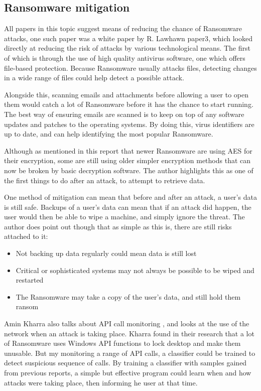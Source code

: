 \documentclass[journal,comsoc]{IEEEtran}
\begin{document}
\subsection{Ransomware mitigation}
All papers in this topic suggest means of reducing the chance of Ransomware attacks, one such paper was a white paper by R. Lawhawn {paper3}, which looked directly at reducing the risk of attacks by various technological means.  The first of which is through the use of high quality antivirus software, one which offers file-based protection. Because Ransomware usually attacks files, detecting changes in a wide range of files could help detect a possible attack. \par
Alongside this, scanning emails and attachments before allowing a user to open them would catch a lot of Ransomware before it has the chance to start running. The best way of ensuring emails are scanned is to keep on top of any software updates and patches to the operating systems. By doing this, virus identifiers are up to date, and can help identifying the most popular Ransomware. \par
Although as mentioned in this report that newer Ransomware are using AES for their encryption, some are still using older simpler encryption methods that can now be broken by basic decryption software. The author highlights this as one of the first things to do after an attack, to attempt to retrieve data. \par
One method of mitigation can mean that before and after an attack, a user's data is still safe. Backups of a user's data can mean that if an attack did happen, the user would then be able to wipe a machine, and simply ignore the threat. The author does point out though that as simple as this is, there are still risks attached to it:
\begin{itemize}
\item Not backing up data regularly could mean data is still lost
\item Critical or sophisticated systems may not always be possible to be wiped and restarted
\item The Ransomware may take a copy of the user's data, and still hold them ransom
\end{itemize}
Amin Kharra also talks about API call monitoring \cite{paper4}, and looks at the use of the network when an attack is taking place. Kharra found in their research that a lot of Ransomware uses Windows API functions to lock desktop and make them unusable. But my monitoring a range of API calls, a classifier could be trained to detect suspicious sequence of calls. By training a classifier with samples gained from previous reports, a simple but effective program could learn when and how attacks were taking place, then informing he user at that time. \par
\end{document}
